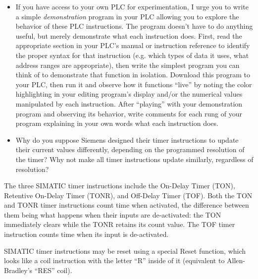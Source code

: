 \begin{itemize}
\item{} If you have access to your own PLC for experimentation, I urge you to write a simple {\it demonstration} program in your PLC allowing you to explore the behavior of these PLC instructions.  The program doesn't have to do anything useful, but merely demonstrate what each instruction does.  First, read the appropriate section in your PLC's manual or instruction reference to identify the proper syntax for that instruction (e.g. which types of data it uses, what address ranges are appropriate), then write the simplest program you can think of to demonstrate that function in isolation.  Download this program to your PLC, then run it and observe how it functions ``live'' by noting the color highlighting in your editing program's display and/or the numerical values manipulated by each instruction.  After ``playing'' with your demonstration program and observing its behavior, write comments for each rung of your program explaining in your own words what each instruction does.
\item{} Why do you suppose Siemens designed their timer instructions to update their current values differently, depending on the programmed resolution of the timer?  Why not make all timer instructions update similarly, regardless of resolution?
\end{itemize}














The three SIMATIC timer instructions include the On-Delay Timer (TON), Retentive On-Delay Timer (TONR), and Off-Delay Timer (TOF).  Both the TON and TONR timer instructions count time when activated, the difference between them being what happens when their inputs are de-activated: the TON immediately clears while the TONR retains its count value.  The TOF timer instruction counts time when its input is de-activated.

SIMATIC timer instructions may be reset using a special Reset function, which looks like a coil instruction with the letter ``R'' inside of it (equivalent to Allen-Bradley's ``RES'' coil).

\vskip 10pt

